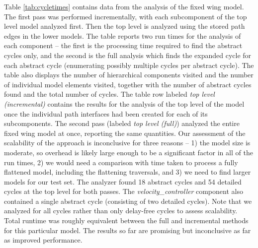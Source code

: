 Table \ref{tab:cycletimes} contains data from the analysis of
the fixed wing model.  The first pass was performed incrementally, with each
subcomponent of the top level model analyzed first.  Then the top level is
analyzed using the stored path edges in the lower models.  The table reports
two run times for the analysis of each component -- the first is the processing time required to find the abstract cycles only, and the second is the full analysis which finds the expanded cycle for each abstract cycle (enumerating possibly multiple cycles per abstract cycle). The table also displays the number of hierarchical components visited and the number of individual model elements visited, together with the number of abstract cycles found and the total number of cycles.  The table row labeled \emph{top level (incremental)} contains the results for the analysis of the top level of the model once the individual path interfaces had been created for each of its subcomponents.  
The second pass (labeled \emph{top level (full)}) analyzed the entire fixed wing model at once, reporting the same quantities.  Our assessment of the scalability of the approach is inconclusive for three reasons -- 1) the model size is moderate, so overhead is likely large enough to be a significant factor in all of the run times, 2) we would need a comparison with time taken to process a fully flattened model, including the flattening traversals, and 3) we need to find larger models for our test set.  The analyzer found 18 abstract cycles and 54 detailed cycles at the top level for both passes.  The \emph{velocity\_controller} component also contained a single abstract cycle (consisting of two detailed cycles). Note that we analyzed for all cycles rather than only delay-free cycles to assess scalability. Total runtime was roughly equivalent between the full and
incremental methods for this particular model. The results so far are promising but inconclusive as far as improved performance.

